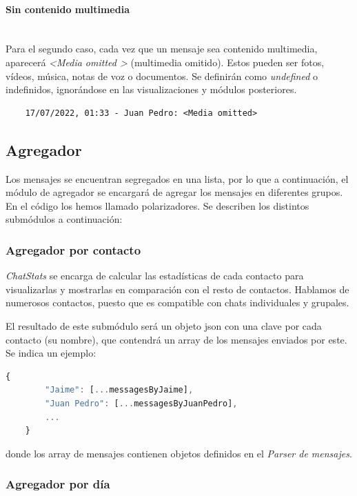 \paragraph{Sin contenido multimedia}\mbox{}\\

Para el segundo caso, cada vez que un mensaje sea contenido multimedia, aparecerá \textit{\textless Media omitted \textgreater} (multimedia omitido). Estos pueden ser fotos, vídeos, música, notas de voz o documentos. Se definirán como \textit{undefined} o indefinidos, ignorándose en las visualizaciones y módulos posteriores.

\begin{lstlisting}
	17/07/2022, 01:33 - Juan Pedro: <Media omitted>
\end{lstlisting}

\subsection{Agregador}

Los mensajes se encuentran segregados en una lista, por lo que a continuación, el módulo de agregador se encargará de agregar los mensajes en diferentes grupos. En el código los hemos llamado polarizadores. Se describen los distintos submódulos a continuación:

\subsubsection{Agregador por contacto}

\textit{ChatStats} se encarga de calcular las estadísticas de cada contacto para visualizarlas y mostrarlas en comparación con el resto de contactos. Hablamos de numerosos contactos, puesto que es compatible con chats individuales y grupales.

El resultado de este submódulo será un objeto \acrshort{json} con una clave por cada contacto (su nombre), que contendrá un array de los mensajes enviados por este. Se indica un ejemplo:

\begin{lstlisting}[language=JavaScript]
	{
		"Jaime": [...messagesByJaime],
		"Juan Pedro": [...messagesByJuanPedro],
		...
	}
\end{lstlisting}

donde los array de mensajes contienen objetos definidos en el \textit{Parser de mensajes}.

\subsubsection{Agregador por día}

